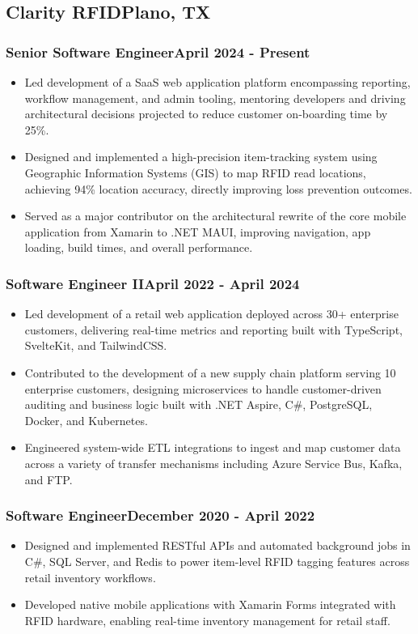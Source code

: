 \newcommand\jobtitle[2]{
	\subsubsection*{\textbf#1\hfill\normalfont#2}
}

\newcommand\position[5]{
	\subsection*{#1\hfill#2}
	\jobtitle{#3}{#4}
	#5
	\vspace{-0.25cm}
}


\position{Clarity RFID}{Plano, TX}{Senior Software Engineer}{April 2024 - Present}{
	\begin{itemize}
		\item Led development of a SaaS web application platform encompassing reporting, workflow management, and admin tooling, mentoring developers and driving architectural decisions projected to reduce customer on-boarding time by 25\%.
		\item Designed and implemented a high-precision item-tracking system using Geographic Information Systems (GIS) to map RFID read locations, achieving 94\% location accuracy, directly improving loss prevention outcomes.
		\item Served as a major contributor on the architectural rewrite of the core mobile application from Xamarin to .NET MAUI, improving navigation, app loading, build times, and overall performance.
	\end{itemize}

	\jobtitle{Software Engineer II}{April 2022 - April 2024}
	\begin{itemize}
		\item Led development of a retail web application deployed across 30+ enterprise customers, delivering real-time metrics and reporting built with TypeScript, SvelteKit, and TailwindCSS.
		\item Contributed to the development of a new supply chain platform serving 10 enterprise customers, designing microservices to handle customer-driven auditing and business logic built with .NET Aspire, C\#, PostgreSQL, Docker, and Kubernetes.
		\item Engineered system-wide ETL integrations to ingest and map customer data across a variety of transfer mechanisms including Azure Service Bus, Kafka, and FTP.
	\end{itemize}

	\jobtitle{Software Engineer}{December 2020 - April 2022}
	\begin{itemize}
		\item Designed and implemented RESTful APIs and automated background jobs in C\#, SQL Server, and Redis to power item-level RFID tagging features across retail inventory workflows.
		\item Developed native mobile applications with Xamarin Forms integrated with RFID hardware, enabling real-time inventory management for retail staff.
	\end{itemize}
}


